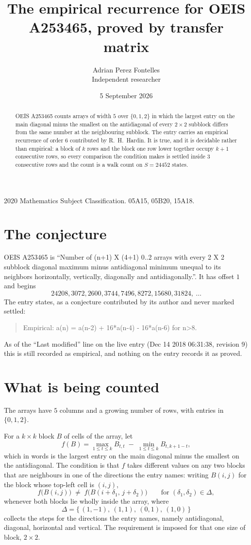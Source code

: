 \documentclass[11pt,a4paper]{article}
\title{The empirical recurrence for OEIS A253465, proved by transfer matrix}
\author{Adrian Perez Fontelles\\ \small Independent researcher}
\date{5 September 2026}
\theoremstyle{plain}
\theoremstyle{definition}
\begin{document}
\maketitle

\begin{abstract}
OEIS A253465 counts arrays of width $5$ over $\{0,1,2\}$ in which the largest entry on the main diagonal minus the smallest on the antidiagonal of every $2\times2$ subblock differs from the same number at the neighbouring subblock. The entry carries an
empirical recurrence of order $6$ contributed by R.~H.~Hardin. It is true, and it is
decidable rather than empirical: a block of $k$ rows and the block one row lower together
occupy $k+1$ consecutive rows, so every comparison the condition makes is settled inside
$3$ consecutive rows and the count is a walk count on $S=24452$ states.
\end{abstract}

\noindent\small 2020 Mathematics Subject Classification. 05A15, 05B20, 15A18.\normalsize

\section{The conjecture}

OEIS A253465 is ``Number of (n+1) X (4+1) 0..2 arrays with every 2 X 2 subblock diagonal maximum minus antidiagonal minimum unequal to its neighbors horizontally, vertically, diagonally and antidiagonally.''. It has offset $1$ and begins
\[
24208, 3072, 2600, 3744, 7496, 8272, 15680, 31824,\ \dots
\]
The entry states, as a conjecture contributed by its author and never marked settled:
\begin{quote}
Empirical: a(n) = a(n-2) + 16*a(n-4) - 16*a(n-6) for n>8.
\end{quote}
As of the ``Last modified'' line on the live entry (Dec 14 2018 06:31:38, revision 9) this is still
recorded as empirical, and nothing on the entry records it as proved.

\section{What is being counted}

The arrays have $5$ columns and a growing number of rows, with entries in $\{0,1,2\}$.

For a $k\times k$ block $B$ of cells of the array, let
\[
f(B)=\max_{1\le t\le k}B_{t,t}\;-\;\min_{1\le t\le k}B_{t,k+1-t} ,
\]
which in words is the largest entry on the main diagonal minus the smallest on the antidiagonal. The condition is that $f$ takes different values on any two blocks that
are neighbours in one of the directions the entry names: writing $B(i,j)$ for the block whose
top-left cell is $(i,j)$,
\[
f\bigl(B(i,j)\bigr)\;\neq\;f\bigl(B(i+\delta_1,\,j+\delta_2)\bigr)
\qquad\text{for }(\delta_1,\delta_2)\in\Delta,
\]
whenever both blocks lie wholly inside the array, where
\[
\Delta=\{\,(1,-1),\ (1,1),\ (0,1),\ (1,0)\,\}
\]
collects the steps for the directions the entry names, namely antidiagonal, diagonal, horizontal and vertical. The
requirement is imposed for that one size of block, $2\times2$.
\end{document}
